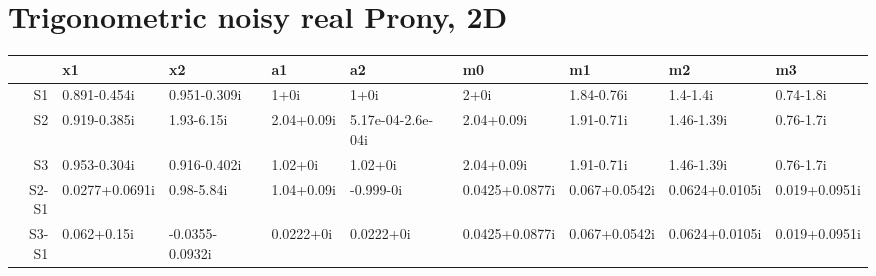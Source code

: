 \section{Trigonometric noisy real Prony, 2D}

\begin{table}
\centering
\begin{tabular}{rllllllll}
  \hline
 & x1 & x2 & a1 & a2 & m0 & m1 & m2 & m3 \\ 
  \hline
S1 & 0.891-0.454i & 0.951-0.309i & 1+0i & 1+0i & 2+0i & 1.84-0.76i & 1.4-1.4i & 0.74-1.8i \\ 
  S2 & 0.919-0.385i & 1.93-6.15i & 2.04+0.09i & 5.17e-04-2.6e-04i & 2.04+0.09i & 1.91-0.71i & 1.46-1.39i & 0.76-1.7i \\ 
  S3 & 0.953-0.304i & 0.916-0.402i & 1.02+0i & 1.02+0i & 2.04+0.09i & 1.91-0.71i & 1.46-1.39i & 0.76-1.7i \\ 
  S2-S1 & 0.0277+0.0691i & 0.98-5.84i & 1.04+0.09i & -0.999-0i & 0.0425+0.0877i & 0.067+0.0542i & 0.0624+0.0105i & 0.019+0.0951i \\ 
  S3-S1 & 0.062+0.15i & -0.0355-0.0932i & 0.0222+0i & 0.0222+0i & 0.0425+0.0877i & 0.067+0.0542i & 0.0624+0.0105i & 0.019+0.0951i \\ 
   \hline
\end{tabular}
\end{table}
  
  
  
